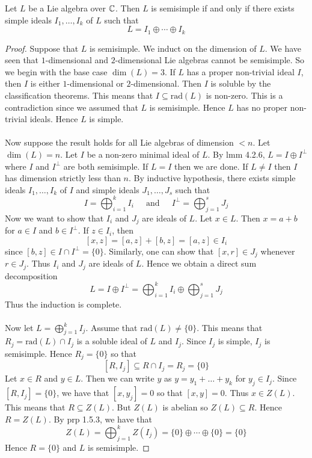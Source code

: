 \documentclass[a4paper]{article}
\begin{document}
\begin{thm}{}{} Let $L$ be a Lie algebra over $\mathbb{C}$. Then $L$ is semisimple if and only if there exists simple ideals $I_1,\dots,I_k$ of $L$ such that $$L=I_1\oplus\cdots\oplus I_k$$ \tcbline
\begin{proof}
Suppose that $L$ is semisimple. We induct on the dimension of $L$. We have seen that $1$-dimensional and $2$-dimensional Lie algebras cannot be semisimple. So we begin with the base case $\dim(L)=3$. If $L$ has a proper non-trivial ideal $I$, then $I$ is either $1$-dimensional or $2$-dimensional. Then $I$ is soluble by the classification theorems. This means that $I\subseteq\text{rad}(L)$ is non-zero. This is a contradiction since we assumed that $L$ is semisimple. Hence $L$ has no proper non-trivial ideals. Hence $L$ is simple. \\~\\

Now suppose the result holds for all Lie algebras of dimension $<n$. Let $\dim(L)=n$. Let $I$ be a non-zero minimal ideal of $L$. By lmm 4.2.6, $L=I\oplus I^\perp$ where $I$ and $I^\perp$ are both semisimple. If $L=I$ then we are done. If $L\neq I$ then $I$ has dimension strictly less than $n$. By inductive hypothesis, there exists simple ideals $I_1,\dots,I_k$ of $I$ and simple ideals $J_1,\dots,J_s$ such that $$I=\bigoplus_{i=1}^k I_i\;\;\;\;\text{ and }\;\;\;\;I^\perp=\bigoplus_{j=1}^sJ_j$$ Now we want to show that $I_i$ and $J_j$ are ideals of $L$. Let $x\in L$. Then $x=a+b$ for $a\in I$ and $b\in I^\perp$. If $z\in I_i$, then $$[x,z]=[a,z]+[b,z]=[a,z]\in I_i$$ since $[b,z]\in I\cap I^\perp=\{0\}$. Similarly, one can show that $[x,r]\in J_j$ whenever $r\in J_j$. Thus $I_i$ and $J_j$ are ideals of $L$. Hence we obtain a direct sum decomposition $$L=I\oplus I^\perp=\bigoplus_{i=1}^kI_i\oplus\bigoplus_{j=1}^sJ_j$$ Thus the induction is complete. \\~\\

Now let $L=\bigoplus_{j=1}^kI_j$. Assume that $\text{rad}(L)\neq\{0\}$. This means that $R_j=\text{rad}(L)\cap I_j$ is a soluble ideal of $L$ and $I_j$. Since $I_j$ is simple, $I_j$ is semisimple. Hence $R_j=\{0\}$ so that $$[R,I_j]\subseteq R\cap I_j=R_j=\{0\}$$ Let $x\in R$ and $y\in L$. Then we can write $y$ as $y=y_1+\dots+y_k$ for $y_j\in I_j$. Since $[R,I_j]=\{0\}$, we have that $[x,y_j]=0$ so that $[x,y]=0$. Thus $x\in Z(L)$. This means that $R\subseteq Z(L)$. But $Z(L)$ is abelian so $Z(L)\subseteq R$. Hence $R=Z(L)$. By prp 1.5.3, we have that $$Z(L)=\bigoplus_{j=1}^kZ(I_j)=\{0\}\oplus\cdots\oplus\{0\}=\{0\}$$ Hence $R=\{0\}$ and $L$ is semisimple. 
\end{proof}
\end{thm}
\end{document}
